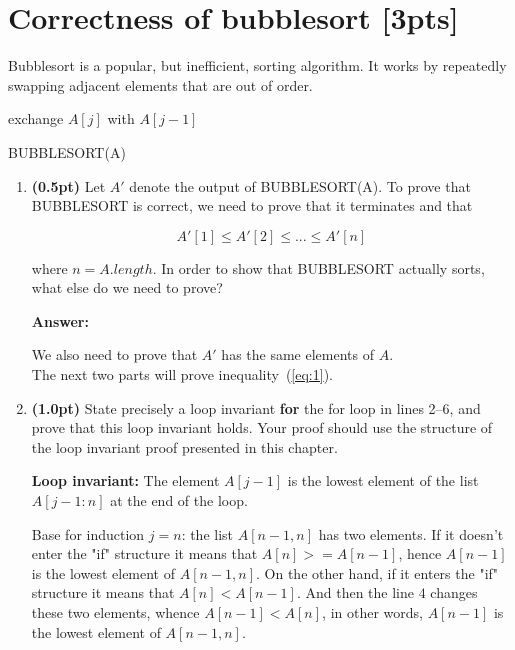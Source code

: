\documentclass{article}
\begin{document}
\section{Correctness of bubblesort [3pts]}
Bubblesort is a popular, but inefficient, sorting algorithm. It works by repeatedly swapping adjacent elements that are out of order.

\begin{algorithm}[H]
\SetAlgoLined
   {
     {
       {
        exchange $A[j]$ with $A[j-1]$
      }
    }
  }
\caption{BUBBLESORT(A)}
\end{algorithm}

\begin{enumerate}[label=\Alph*]
  \item \textbf{(0.5pt)} Let $A'$ denote the output of BUBBLESORT(A). To prove that BUBBLESORT is correct, we need to prove that it terminates and that

  \begin{equation} \label{eq:1}
    A'[1] \leq A'[2] \leq ... \leq A'[n]
  \end{equation}

  where $n = A.length$. In order to show that BUBBLESORT actually sorts, what else do we need to prove?

  \textbf{Answer:}

  We also need to prove that $A'$ has the same elements of $A$.
\\


  The next two parts will prove inequality~(\ref{eq:1}).

  \item \textbf{(1.0pt)} State precisely a loop invariant \textbf{for} the for loop in lines 2–6, and prove that this loop invariant holds. Your proof should use the structure of the loop invariant proof presented in this chapter.
  
  
  \textbf{Loop invariant:} The element $A[j-1]$ is the lowest element of the list $A[j-1:n]$ at the end of the loop.
  
  Base for induction $j=n$: the list $A[n-1,n]$ has two elements. If it doesn't enter the "if" structure it means that $A[n]>=A[n-1]$, hence $A[n-1]$ is the lowest element of $A[n-1,n]$. On the other hand, if it enters the "if" structure it means that $A[n]<A[n-1]$. And then the line $4$ changes these two elements, whence $A[n-1]<A[n]$, in other words, $A[n-1]$ is the lowest element of $A[n-1,n]$.
  

\end{enumerate}
\end{document}
